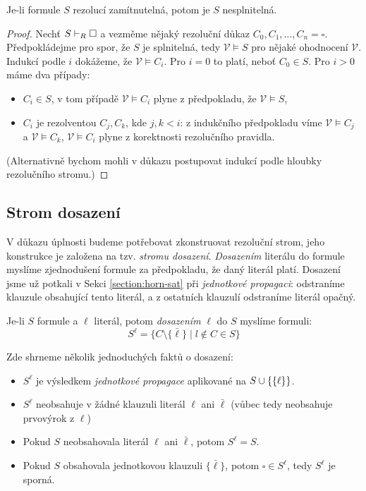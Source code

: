 \begin{theorem}\label{theorem:soundness-resolution}
    
Je-li formule $S$ rezolucí zamítnutelná, potom je $S$ nesplnitelná.
\end{theorem}
\begin{proof}
    Nechť $S\vdash_R\square$ a vezměme nějaký rezoluční důkaz $C_0,C_1,\dots,C_n=\square$. Předpokládejme pro spor, že $S$ je splnitelná, tedy $\mathcal V\models S$ pro nějaké ohodnocení $\mathcal V$. Indukcí podle $i$ dokážeme, že $\mathcal V\models C_i$. Pro $i=0$ to platí, neboť $C_0\in S$. Pro $i>0$ máme dva případy:
    \begin{itemize}
        \item $C_i\in S$, v tom případě $\mathcal V\models C_i$ plyne z předpokladu, že $\mathcal V\models S$,
        \item $C_i$ je rezolventou $C_j,C_k$, kde $j,k<i$: z indukčního předpokladu víme $\mathcal V\models C_j$ a $\mathcal V\models C_k$, $\mathcal V\models C_i$ plyne z korektnosti rezolučního pravidla.
    \end{itemize}
    (Alternativně bychom mohli v důkazu postupovat indukcí podle hloubky rezolučního stromu.)
\end{proof}


\subsection{Strom dosazení}

V důkazu úplnosti budeme potřebovat zkonstruovat rezoluční strom, jeho konstrukce je založena na tzv. \emph{stromu dosazení}. \emph{Dosazením} literálu do formule myslíme zjednodušení formule za předpokladu, že daný literál platí. Dosazení jsme už potkali v Sekci \ref{section:horn-sat} při \emph{jednotkové propagaci}: odstraníme klauzule obsahující tento literál, a z ostatních klauzulí odstraníme literál opačný.

\begin{definition}
    Je-li $S$ formule a $\ell$ literál, potom \emph{dosazením} $\ell$ do $S$ myslíme formuli:
    $$
        S^\ell=\{C\setminus\{\bar\ell\}\mid l\notin C\in S\}
    $$    
\end{definition}

\begin{observation} Zde shrneme několik jednoduchých faktů o dosazení:
\begin{itemize}
    \item $S^\ell$ je výsledkem \emph{jednotkové propagace} aplikované na $S\mathbin{\cup}\{\{\ell\}\}$.
    \item $S^\ell$ neobsahuje v žádné klauzuli literál $\ell$ ani $\bar\ell$ (vůbec tedy neobsahuje prvovýrok z $\ell$)
    \item Pokud $S$ neobsahovala literál $\ell$ ani $\bar\ell$, potom $S^\ell=S$.
    \item Pokud $S$ obsahovala jednotkovou klauzuli $\{\bar\ell\}$, potom $\square\in S^\ell$, tedy $S^\ell$ je sporná.
\end{itemize}    
\end{observation}

